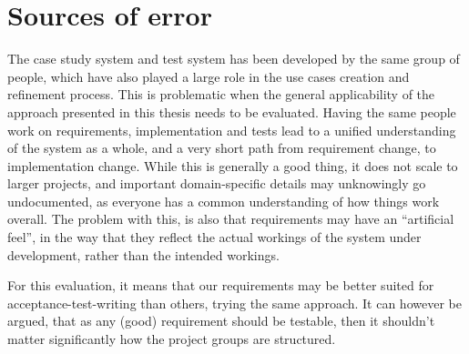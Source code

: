 \section{Sources of error}
The case study system and test system has been developed by the same group of people, which have also played a large role in the use cases creation and refinement process. This is problematic when the general applicability of the approach presented in this thesis needs to be evaluated. Having the same people work on requirements, implementation and tests lead to a unified understanding of the system as a whole, and a very short path from requirement change, to implementation change. While this is generally a good thing, it does not scale to larger projects, and important domain-specific details may unknowingly go undocumented, as everyone has a common understanding of how things work overall. The problem with this, is also that requirements may have an ``artificial feel'', in the way that they reflect the actual workings of the system under development, rather than the intended workings.\medskip

\noindent For this evaluation, it means that our requirements may be better suited for acceptance-test-writing than others, trying the same approach. It can however be argued, that as any (good) requirement should be testable\cite{hull2010requirements}, then it shouldn't matter significantly how the project groups are structured.




